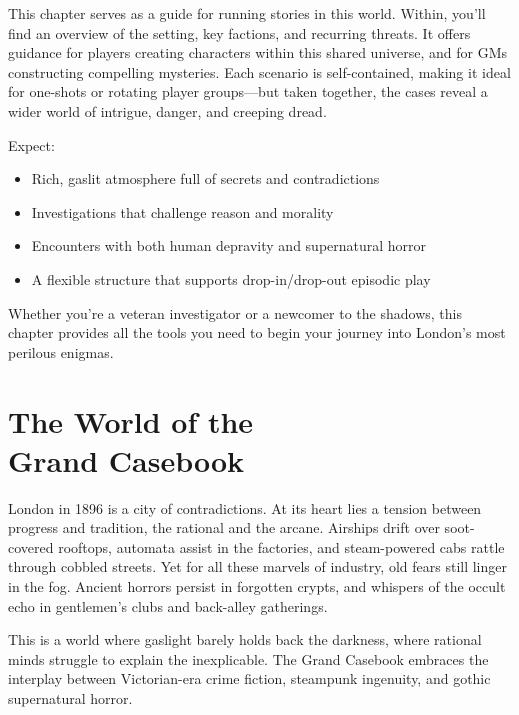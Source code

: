 This chapter serves as a guide for running stories in this world. Within, you'll find an overview of the setting, key factions, and recurring threats. It offers guidance for players creating characters within this shared universe, and for GMs constructing compelling mysteries. Each scenario is self-contained, making it ideal for one-shots or rotating player groups—but taken together, the cases reveal a wider world of intrigue, danger, and creeping dread.

\newcolumn
\noindent Expect:
\begin{itemize}\raggedright
    \item Rich, gaslit atmosphere full of secrets and contradictions
    \item Investigations that challenge reason and morality
    \item Encounters with both human depravity and supernatural horror
    \item A flexible structure that supports drop-in/drop-out episodic play
\end{itemize}

\vspace{.75\baselineskip}\noindent
Whether you’re a veteran investigator or a newcomer to the shadows, this chapter provides all the tools you need to begin your journey into London’s most perilous enigmas.


\section[The World of the Grand Casebook]{The World of the\\ Grand Casebook}

London in 1896 is a city of contradictions. At its heart lies a tension between progress and tradition, the rational and the arcane. Airships drift over soot-covered rooftops, automata assist in the factories, and steam-powered cabs rattle through cobbled streets. Yet for all these marvels of industry, old fears still linger in the fog. Ancient horrors persist in forgotten crypts, and whispers of the occult echo in gentlemen’s clubs and back-alley gatherings.

This is a world where gaslight barely holds back the darkness, where rational minds struggle to explain the inexplicable. The Grand Casebook embraces the interplay between Victorian-era crime fiction, steampunk ingenuity, and gothic supernatural horror.

